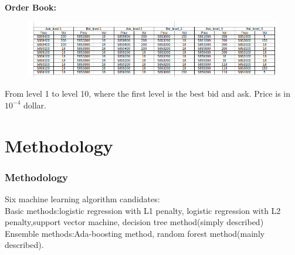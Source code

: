 \documentclass[xcolor={x11names,svgnames,dvipsnames}]{beamer}
\begin{document}
\begin{frame}
	\textbf{Order Book:}
	\begin{figure}
		\includegraphics[width=1\textwidth, height=0.5\textheight]{order_book_new.png}
	\end{figure}
From level \alert{1 to level 10}, where the first level is the best bid and ask. Price is in \alert{$10^{-4}$} dollar.	
\end{frame}



\section{Methodology}
\begin{frame}
\frametitle{Methodology}
Six machine learning algorithm candidates:\\
 \vspace{1cm}
Basic methods:logistic regression with L1 penalty, logistic regression with L2 penalty,support vector machine, decision tree method(simply described)\\
\vspace{1cm}
Ensemble methods:Ada-boosting method, random forest method(mainly described).


\end{frame}
\end{document}
